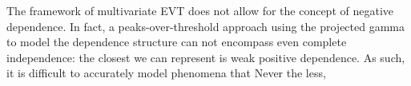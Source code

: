 
    The framework of multivariate EVT does not allow for the concept of negative dependence.  In fact, 
    a peaks-over-threshold approach using the projected gamma to model the dependence structure can not 
    encompass even complete independence: the closest we can represent is weak positive dependence.
    As such, it is difficult to accurately model phenomena that 
    Never the less, 

    






